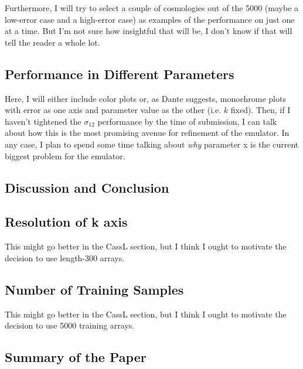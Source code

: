 \documentclass[11pt]{article}
\begin{document}
Furthermore, I will try to select a couple of cosmologies out of the 5000 (maybe a low-error case and a high-error case) as examples of the performance on just one at a time. But I'm not sure how insightful that will be, I don't know if that will tell the reader a whole lot.

\begin{centering}
\subsection{Performance in Different Parameters}
\end{centering}

Here, I will either include color plots or, as Dante suggests, monochrome plots with error as one axis and parameter value as the other (i.e. $k$ fixed). Then, if I haven't tightened the $\sigma_{12}$ performance by the time of submission, I can talk about how this is the most promising avenue for refinement of the emulator. In any case, I plan to spend some time talking about \textit{why} parameter x is the current biggest problem for the emulator. 

\begin{centering}
\section{Discussion and Conclusion}
\end{centering}

\begin{centering}
\subsection{Resolution of k axis}
\end{centering}

This might go better in the CassL section, but I think I ought to motivate the decision to use length-300 arrays.

\begin{centering}
\subsection{Number of Training Samples}
\end{centering}

This might go better in the CassL section, but I think I ought to motivate the decision to use 5000 training arrays.

\begin{centering}
\subsection{Summary of the Paper}
\end{centering}
\end{document}
